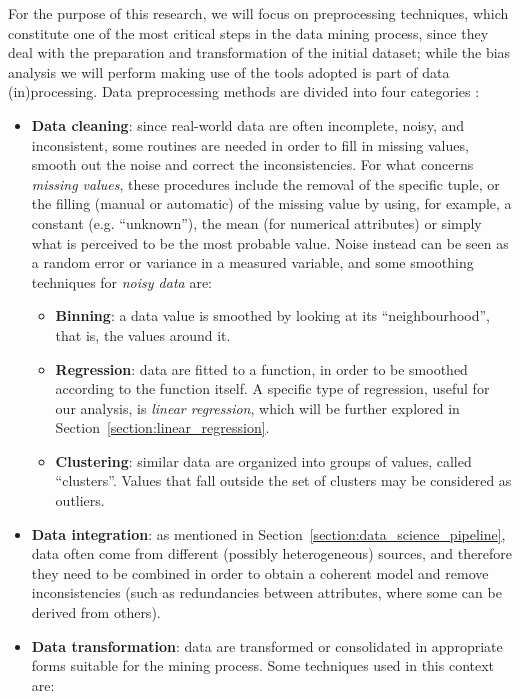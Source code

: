 For the purpose of this research, we will focus on preprocessing techniques, which constitute one of the most critical steps in the data mining process, since they deal with the preparation and transformation of the initial dataset; while the bias analysis we will perform making use of the tools adopted is part of data (in)processing. Data preprocessing methods are divided into four categories \cite{tamilselvi2015efficient}:
\begin{itemize}
\item \textbf{Data cleaning}: since real-world data are often incomplete, noisy, and inconsistent, some routines are needed in order to fill in missing values, smooth out the noise and correct the inconsistencies.
For what concerns \textit{missing values}, these procedures include the removal of the specific tuple, or the filling (manual or automatic) of the missing value by using, for example, a constant (e.g. ``unknown''), the mean (for numerical attributes) or simply what is perceived to be the most probable value.
Noise instead can be seen as a random error or variance in a measured variable, and some smoothing techniques for \textit{noisy data} are:
\begin{itemize}
\item \textbf{Binning}: a data value is smoothed by looking at its ``neighbourhood'', that is, the values around it.
\item \textbf{Regression}: data are fitted to a function, in order to be smoothed according to the function itself. A specific type of regression, useful for our analysis, is \textit{linear regression}, which will be further explored in Section~\ref{section:linear_regression}.
\item \textbf{Clustering}: similar data are organized into groups of values, called ``clusters''. Values that fall outside the set of clusters may be considered as outliers.
\end{itemize}
\item \textbf{Data integration}: as mentioned in Section~\ref{section:data_science_pipeline}, data often come from different (possibly heterogeneous) sources, and therefore they need to be combined in order to obtain a coherent model and remove inconsistencies (such as redundancies between attributes, where some can be derived from others).
\item \textbf{Data transformation}: data are transformed or consolidated in appropriate forms suitable for the mining process. Some techniques used in this context are:
\begin{itemize}

\end{itemize}
\end{itemize}
